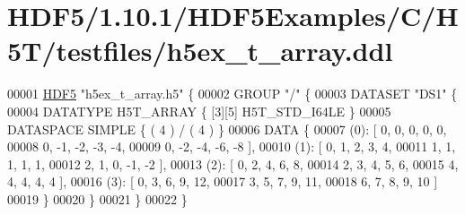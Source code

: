 \hypertarget{_h_d_f5_21_810_81_2_h_d_f5_examples_2_c_2_h5_t_2testfiles_2h5ex__t__array_8ddl_source}{}\section{H\+D\+F5/1.10.1/\+H\+D\+F5\+Examples/\+C/\+H5\+T/testfiles/h5ex\+\_\+t\+\_\+array.ddl}
\label{_h_d_f5_21_810_81_2_h_d_f5_examples_2_c_2_h5_t_2testfiles_2h5ex__t__array_8ddl_source}

\begin{DoxyCode}
00001 \hyperlink{namespace_h_d_f5}{HDF5} \textcolor{stringliteral}{"h5ex\_t\_array.h5"} \{
00002 GROUP \textcolor{stringliteral}{"/"} \{
00003    DATASET \textcolor{stringliteral}{"DS1"} \{
00004       DATATYPE  H5T\_ARRAY \{ [3][5] H5T\_STD\_I64LE \}
00005       DATASPACE  SIMPLE \{ ( 4 ) / ( 4 ) \}
00006       DATA \{
00007       (0): [ 0, 0, 0, 0, 0,
00008             0, -1, -2, -3, -4,
00009             0, -2, -4, -6, -8 ],
00010       (1): [ 0, 1, 2, 3, 4,
00011             1, 1, 1, 1, 1,
00012             2, 1, 0, -1, -2 ],
00013       (2): [ 0, 2, 4, 6, 8,
00014             2, 3, 4, 5, 6,
00015             4, 4, 4, 4, 4 ],
00016       (3): [ 0, 3, 6, 9, 12,
00017             3, 5, 7, 9, 11,
00018             6, 7, 8, 9, 10 ]
00019       \}
00020    \}
00021 \}
00022 \}
\end{DoxyCode}
